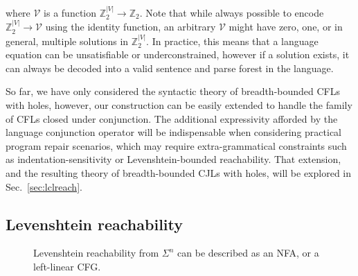 \documentclass[sigplan,review,anonymous,acmsmall]{acmart}\settopmatter{printfolios=false,printccs=false,printacmref=false}
\begin{document}
\noindent where $\mathcal{V}$ is a function $\mathbb{Z}_2^{|V|}\rightarrow\mathbb{Z}_2$. Note that while always possible to encode $\mathbb{Z}_2^{|V|} \rightarrow \mathcal{V}$ using the identity function, an arbitrary $\mathcal{V}$ might have zero, one, or in general, multiple solutions in $\mathbb{Z}_2^{|V|}$. In practice, this means that a language equation can be unsatisfiable or underconstrained, however if a solution exists, it can always be decoded into a valid sentence and parse forest in the language.

So far, we have only considered the syntactic theory of breadth-bounded CFLs with holes, however, our construction can be easily extended to handle the family of CFLs closed under conjunction. The additional expressivity afforded by the language conjunction operator will be indispensable when considering practical program repair scenarios, which may require extra-grammatical constraints such as indentation-sensitivity or Levenshtein-bounded reachability. That extension, and the resulting theory of breadth-bounded CJLs with holes, will be explored in Sec.~\ref{sec:lclreach}.

\subsection{Levenshtein reachability}\label{sec:levenshtein}

%
%

\begin{figure}
  \resizebox{.5\textwidth}{!}{}
  \caption{Levenshtein reachability from $\Sigma^n$ can be described as an NFA, or a left-linear CFG.}
\end{figure}
\end{document}
